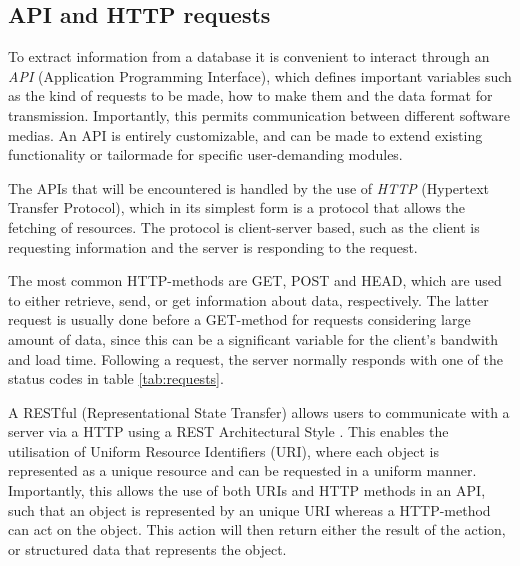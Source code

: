 \subsection{API and HTTP requests}

To extract information from a database it is convenient to interact through an \textit{API} (Application Programming Interface), which defines important variables such as the kind of requests to be made, how to make them and the data format for transmission. Importantly, this permits communication between different software medias. An API is entirely customizable, and can be made to extend existing functionality or tailormade for specific user-demanding modules.

The APIs that will be encountered is handled by the use of \textit{HTTP} (Hypertext Transfer Protocol), which in its simplest form is a protocol that allows the fetching of resources. The protocol is client-server based, such as the client is requesting information and the server is responding to the request.

The most common HTTP-methods are GET, POST and HEAD, which are used to either retrieve, send, or get information about data, respectively. The latter request is usually done before a GET-method for requests considering large amount of data, since this can be a significant variable for the client's bandwith and load time. Following a request, the server normally responds with one of the status codes in table \ref{tab:requests}.

\begin{table}[!ht]
\centering
\noindent{}
\caption{Numeric status code for response. The leftmost digit decide the type of response, while the two follow-up digits depends on the implemented API.}
\label{tab:requests}
\end{table}

A RESTful (Representational State Transfer) allows users to communicate with a server via a HTTP using a REST Architectural Style \cite{Battle2008}. This enables the utilisation of Uniform Resource Identifiers (URI), where each object is represented as a unique resource and can be requested in a uniform manner. Importantly, this allows the use of both URIs and HTTP methods in an API, such that an object is represented by an unique URI whereas a HTTP-method can act on the object. This action will then return either the result of the action, or structured data that represents the object.

